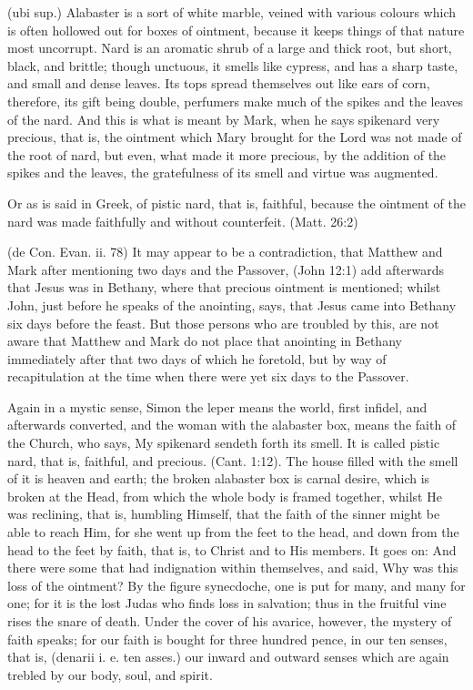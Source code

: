  (ubi sup.) Alabaster is a sort of white marble, veined with various colours which is often hollowed out for boxes of ointment, because it keeps things of that nature most uncorrupt. Nard is an aromatic shrub of a large and thick root, but short, black, and brittle; though unctuous, it smells like cypress, and has a sharp taste, and small and dense leaves. Its tops spread themselves out like ears of corn, therefore, its gift being double, perfumers make much of the spikes and the leaves of the nard. And this is what is meant by Mark, when he says spikenard very precious, that is, the ointment which Mary brought for the Lord was not made of the root of nard, but even, what made it more precious, by the addition of the spikes and the leaves, the gratefulness of its smell and virtue was augmented.

 Or as is said in Greek, of pistic nard, that is, faithful, because the ointment of the nard was made faithfully and without counterfeit. (Matt. 26:2)

 (de Con. Evan. ii. 78) It may appear to be a contradiction, that Matthew and Mark after mentioning two days and the Passover, (John 12:1) add afterwards that Jesus was in Bethany, where that precious ointment is mentioned; whilst John, just before he speaks of the anointing, says, that Jesus came into Bethany six days before the feast. But those persons who are troubled by this, are not aware that Matthew and Mark do not place that anointing in Bethany immediately after that two days of which he foretold, but by way of recapitulation at the time when there were yet six days to the Passover.

 Again in a mystic sense, Simon the leper means the world, first infidel, and afterwards converted, and the woman with the alabaster box, means the faith of the Church, who says, My spikenard sendeth forth its smell. It is called pistic nard, that is, faithful, and precious. (Cant. 1:12). The house filled with the smell of it is heaven and earth; the broken alabaster box is carnal desire, which is broken at the Head, from which the whole body is framed together, whilst He was reclining, that is, humbling Himself, that the faith of the sinner might be able to reach Him, for she went up from the feet to the head, and down from the head to the feet by faith, that is, to Christ and to His members. It goes on: And there were some that had indignation within themselves, and said, Why was this loss of the ointment? By the figure synecdoche, one is put for many, and many for one; for it is the lost Judas who finds loss in salvation; thus in the fruitful vine rises the snare of death. Under the cover of his avarice, however, the mystery of faith speaks; for our faith is bought for three hundred pence, in our ten senses, that is, (denarii i. e. ten asses.) our inward and outward senses which are again trebled by our body, soul, and spirit.

